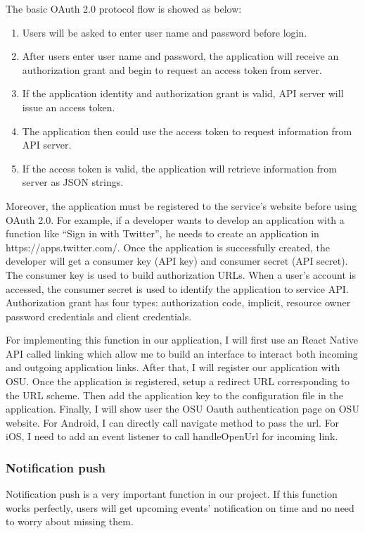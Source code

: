 \documentclass[letterpaper, 10pt,titlepage]{article}
\begin{document}
The basic OAuth 2.0 protocol flow is showed as below: 
\begin{enumerate}
\item Users will be asked to enter user name and password before login. 
\item After users enter user name and password, the application will receive an authorization grant and begin to request an access token from server. 
\item If the application identity and authorization grant is valid, API server will issue an access token. 
\item The application then could use the access token to request information from API server. 
\item If the access token is valid, the application will retrieve information from server as JSON strings.
\end{enumerate}
Moreover, the application must be registered to the service’s website before using OAuth 2.0. For example, if a developer wants to develop an application with a function like “Sign in with Twitter”, he needs to create an application in https://apps.twitter.com/. Once the application is successfully created, the developer will get a consumer key (API key) and consumer secret (API secret). The consumer key is used to build authorization URLs.  When a user’s account is accessed, the consumer secret is used to identify the application to service API. Authorization grant has four types: authorization code, implicit, resource owner password credentials and client credentials.\cite{OAuth2}

For implementing this function in our application, I will first use an React Native API called linking which allow me to build an interface to interact both incoming and outgoing application links. After that, I will register our application with OSU. Once the application is registered, setup a redirect URL corresponding to the URL scheme. Then add the application key to the configuration file in the application. Finally, I will show user the OSU Oauth authentication page on OSU website. For Android, I can directly call navigate method to pass the url. For iOS, I need to add an event listener to call handleOpenUrl for incoming link.

\subsubsection{Notification push}
Notification push is a very important function in our project. If this function works perfectly, users will get upcoming events' notification on time and no need to worry about missing them.
\end{document}
